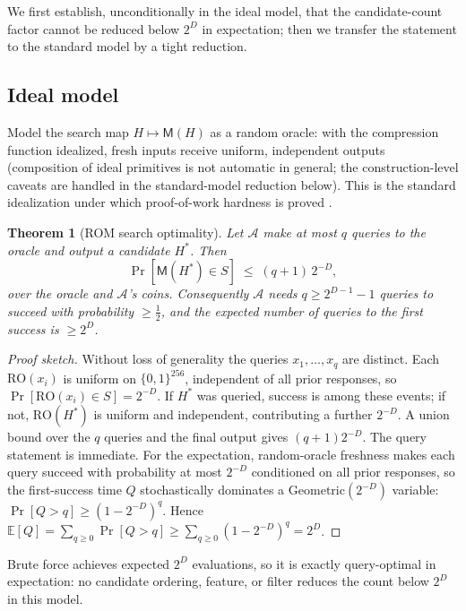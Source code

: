 \documentclass[11pt]{article}
\newtheorem{theorem}{Theorem}
\theoremstyle{remark}
\newcommand{\Mhash}{\mathsf{M}}
\begin{document}
We first establish, unconditionally in the ideal model, that the
candidate-count factor cannot be reduced below $2^{D}$ in expectation;
then we transfer the statement to the standard model by a tight
reduction.

\subsection{Ideal model}

Model the search map $H\mapsto\Mhash(H)$ as a random oracle: with the
compression function idealized, fresh inputs receive uniform, independent
outputs (composition of ideal primitives is not automatic in general; the
construction-level caveats are handled in the standard-model reduction
below). This is the standard idealization under which proof-of-work
hardness is proved \cite{backbone}.

\begin{theorem}[ROM search optimality]\label{thm:rom}
Let $\mathcal{A}$ make at most $q$ queries to the oracle and output a
candidate $H^\ast$. Then
\[
  \Pr[\Mhash(H^\ast)\in S] \;\le\; (q+1)\,2^{-D},
\]
over the oracle and $\mathcal{A}$'s coins. Consequently $\mathcal{A}$
needs $q \ge 2^{D-1}-1$ queries to succeed with probability $\ge \tfrac12$,
and the expected number of queries to the first success is
$\ge 2^{D}$.
\end{theorem}

\begin{proof}[Proof sketch]
Without loss of generality the queries $x_1,\dots,x_q$ are distinct.
Each $\mathrm{RO}(x_i)$ is uniform on $\{0,1\}^{256}$, independent of all
prior responses, so $\Pr[\mathrm{RO}(x_i)\in S]=2^{-D}$. If $H^\ast$ was
queried, success is among these events; if not, $\mathrm{RO}(H^\ast)$ is
uniform and independent, contributing a further $2^{-D}$. A union bound
over the $q$ queries and the final output gives $(q+1)2^{-D}$. The query
statement is immediate. For the expectation, random-oracle freshness makes
each query succeed with probability at most $2^{-D}$ conditioned on all
prior responses, so the first-success time $Q$ stochastically dominates a
$\mathrm{Geometric}(2^{-D})$ variable: $\Pr[Q>q]\ge(1-2^{-D})^{q}$. Hence
$\mathbb{E}[Q]=\sum_{q\ge0}\Pr[Q>q]\ge\sum_{q\ge0}(1-2^{-D})^{q}=2^{D}$.
\end{proof}

Brute force achieves expected $2^{D}$ evaluations, so it is
exactly query-optimal in expectation: no candidate ordering, feature,
or filter reduces the count below $2^{D}$ in this model.
\end{document}
